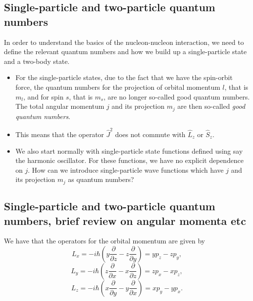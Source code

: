 \documentclass[%
twoside,                 %
final,                   %
10pt]{article}
\begin{document}
\subsection{Single-particle and two-particle quantum numbers}
\begin{block}{}
In order to understand the basics of the nucleon-nucleon interaction, we need to define the relevant quantum numbers and how we build up a single-particle state and a two-body state. 

\begin{itemize}
\item For the single-particle states, due to the fact that we have the spin-orbit force, the quantum numbers for the projection of orbital momentum $l$, that is $m_l$, and for spin $s$, that is $m_s$, are no longer so-called good quantum numbers. The total angular momentum $j$ and its projection $m_j$ are then  so-called \emph{good quantum numbers}.

\item This means that the operator $\hat{J}^2$ does not commute with $\hat{L}_z$  or $\hat{S}_z$.  

\item We also start normally with single-particle state functions defined using say the harmonic oscillator. For these functions, we have no explicit dependence on $j$. How can we introduce single-particle wave functions which have $j$ and its projection $m_j$ as quantum numbers? 
\end{itemize}

\noindent
\end{block}


\subsection{Single-particle and two-particle quantum numbers, brief review on angular momenta etc}

\begin{block}{}
We have that the operators for the orbital momentum are given by
\[
L_x=-i\hbar(y\frac{\partial }{\partial z}-z\frac{\partial }{\partial y})=
yp_z-zp_y,
\]
\[
L_y=-i\hbar(z\frac{\partial }{\partial x}-x\frac{\partial }{\partial z})= zp_x-xp_z,
\]
\[
L_z=-i\hbar(x\frac{\partial }{\partial y}-y\frac{\partial }{\partial x})=xp_y-yp_x.
\]
\end{block}

\end{document}
